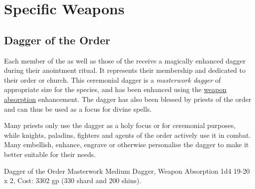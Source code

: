 \section{Specific Weapons}
\label{sec:Weapons}

\subsection{Dagger of the Order}
\label{sec:Dagger of the Order}

Each member of the  as well as those of the
 receive a magically enhanced dagger
during their anointment ritual. It represents their membership and dedicated
to their order or church. This ceremonial dagger is a \emph{masterwork dagger}
of appropriate size for the species, and has been enhanced using the
\hyperref[sec:Weapon Absorption]{weapon absorption} enhancement. The dagger
has also been blessed by priests of the order and can thus be used as a focus
for divine spells.

Many priests only use the dagger as a holy focus or for ceremonial purposes,
while knights, paladins, fighters and agents of the order actively use it
in combat. Many embellish, enhance, engrave or otherwise personalise the
dagger to make it better suitable for their needs.

\begin{35e}{Dagger of the Order}
  Masterwork Medium Dagger, Weapon Absorption 1d4 19-20 x 2, Cost: 3302
  gp (330 shard and 200 shins).
\end{35e}
